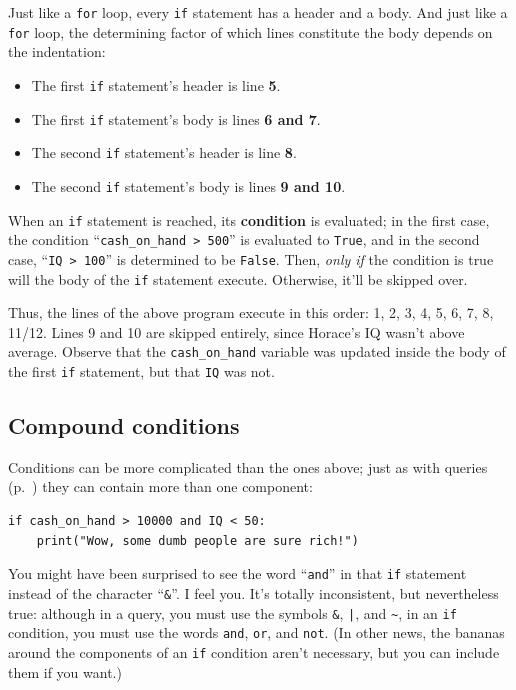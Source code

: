 Just like a \texttt{for} loop, every \texttt{if} statement has a header and a
body. And just like a \texttt{for} loop, the determining factor of which lines
constitute the body depends on the indentation:

\begin{itemize}[nosep]
\item The first \texttt{if} statement's header is line \textbf{5}.
\item The first \texttt{if} statement's body is lines \textbf{6 and 7}.
\item The second \texttt{if} statement's header is line \textbf{8}.
\item The second \texttt{if} statement's body is lines
\textbf{9 and 10}.
\end{itemize}


When an \texttt{if} statement is reached, its \textbf{condition} is evaluated;
in the first case, the condition ``\texttt{cash\_on\_hand > 500}'' is evaluated
to \texttt{True}, and in the second case, ``\texttt{IQ > 100}'' is determined
to be \texttt{False}. Then, \textit{only if} the condition is true will the
body of the \texttt{if} statement execute. Otherwise, it'll be skipped over.

Thus, the lines of the above program execute in this order: 1, 2, 3, 4, 5, 6,
7, 8, 11/12. Lines 9 and 10 are skipped entirely, since Horace's IQ wasn't above
average. Observe that the \texttt{cash\_on\_hand} variable was updated inside
the body of the first \texttt{if} statement, but that \texttt{IQ} was not.

\subsection{Compound conditions}


Conditions can be more complicated than the ones above; just as with queries
(p.~\pageref{seriesCompoundQueries}) they can contain more than one component:

\begin{Verbatim}[fontsize=\small,samepage=true,frame=single,framesep=3mm]
if cash_on_hand > 10000 and IQ < 50:
    print("Wow, some dumb people are sure rich!")
\end{Verbatim}


You might have been surprised to see the word ``\texttt{and}'' in that
\texttt{if} statement instead of the character ``\texttt{\&}''. I feel you.
It's totally inconsistent, but nevertheless true: although in a query, you must
use the symbols \texttt{\&}, \texttt{|}, and \texttt{\textasciitilde}, in an
\texttt{if} condition, you must use the words \texttt{and}, \texttt{or}, and
\texttt{not}. (In other news, the bananas around the components of an
\texttt{if} condition aren't necessary, but you can include them if you want.)

